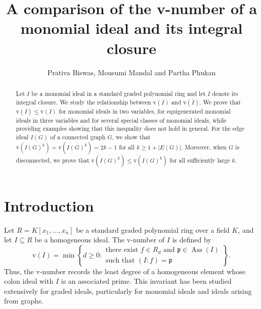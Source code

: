 \documentclass[11pt,reqno,a4paper]{amsart}
\title[A comparison of the v-number of a monomial ideal and its integral closure]{A comparison of the v-number of a monomial ideal and its integral closure}
\author{Prativa Biswas, Mousumi Mandal and Partha Phukan}
\theoremstyle{definition}
\begin{document}
\maketitle

\begin{abstract}
Let $I$ be a monomial ideal in a standard graded polynomial ring and let $\overline{I}$ denote its integral closure. We study the relationship between $\mathrm{v}(I)$ and $\mathrm{v}(\overline{I})$. We prove that
\(
\mathrm{v}(\overline{I}) \leq \mathrm{v}(I)
\)
for monomial ideals in two variables, for equigenerated monomial ideals in three variables and for several special classes of monomial ideals, while providing examples showing that this inequality does not hold in general. For the edge ideal $I(G)$ of a connected graph $G$, we show that
\(
\mathrm{v}(I(G)^k)=\mathrm{v}(\overline{I(G)^k})
=
2k-1
\)
for all $k \geq 1+|E(G)|$. Moreover, when $G$ is disconnected, we prove that
\(
\mathrm{v}(\overline{I(G)^k})\leq\mathrm{v}({I(G)^k})
\)
for all sufficiently large $k$.
\end{abstract}





\section{Introduction}

\noindent Let $R=K[x_1,\ldots,x_n]$ be a standard graded polynomial ring over a field
$K$, and let $I\subseteq R$ be a homogeneous ideal. The $\mathrm{v}$-number
of $I$ is defined by
\[
\mathrm{v}(I)
=
\min\left\{
d\geq 0 :
\begin{array}{l}
\text{there exist } f\in R_d \text{ and }
\mathfrak{p}\in\operatorname{Ass}(I)\\
\text{such that } (I:f)=\mathfrak{p}
\end{array}
\right\}.
\]
Thus, the $\mathrm{v}$-number records the least degree of a homogeneous
element whose colon ideal with $I$ is an associated prime. This invariant
has been studied extensively for graded ideals, particularly for monomial
ideals and ideals arising from graphs.
\end{document}
